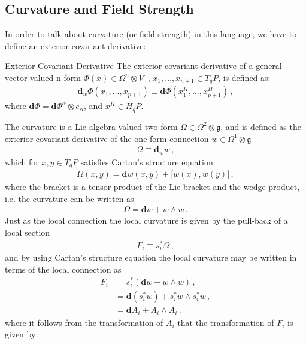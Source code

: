 \subsection{Curvature and Field Strength}
In order to talk about curvature (or field strength) in this language, we have to define an exterior covariant derivative:

\medskip
\begin{mydef}{Exterior Covariant Derivative}{}
The exterior covariant derivative of a general vector valued n-form $\Phi(x)\in \Omega^{n}\otimes V$ \,, $x_1,\dots,x_{n+1}\in T_{q}P$, is defined as:
\begin{align}
    \textbf{d}_{w}\Phi(x_1,\dots, x_{p+1})\equiv \textbf{d}\Phi(x_{1}^{H},\dots,x_{p+1}^{H})\,,
\end{align}
where $\textbf{d}\Phi=\textbf{d}\Phi^{\alpha}\otimes e_{\alpha}$, and $x^{H}\in H_{q}P$.
\end{mydef}\noindent
The curvature is a Lie algebra valued two-form $\Omega\in\Omega^{2}\otimes \mathfrak{g}$, and is defined as the exterior covariant derivative of the one-form connection $w\in\Omega^{1}\otimes \mathfrak{g}$
\begin{align}
    \Omega\equiv\textbf{d}_{w}w\,,
\end{align}
which for $x,y\in T_{q}P$ satisfies Cartan's structure equation
\begin{align}\label{Cartan structure equation}
    \Omega(x,y)=\textbf{d}w(x,y)+\mathbf{[}w(x),w(y)\mathbf{]}\,,
\end{align}
where the bracket is a tensor product of the Lie bracket and the wedge product, i.e. the curvature can be written as
\begin{align}
    \Omega=\textbf{d}w+w\wedge w\,.
\end{align}
Just as the local connection the local curvature is given by the pull-back of a local section
\begin{align}
    F_{i}\equiv s_{i}^{*}\Omega\,,
\end{align}
and by using Cartan's structure equation the local curvature may be written in terms of the local connection as
\begin{align}
    F_{i}&=s_{i}^{*}(\textbf{d}w+w\wedge w)\nonumber\,,
    \\
    &=\textbf{d}(s_{i}^{*}w)+s_{i}^{*}w\wedge s_{i}^{*}w\nonumber\,,
    \\
    &=\textbf{d}A_{i}+A_{i}\wedge A_{i}\,.
\end{align}
where it follows from the transformation of $A_i$ that the transformation of $F_i$ is given by
